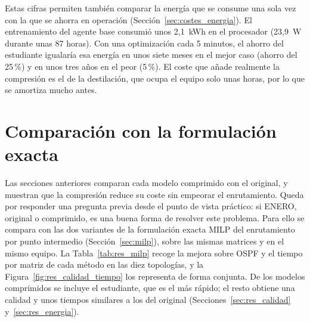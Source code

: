 Estas cifras permiten también comparar la energía que se consume una sola vez con la que se ahorra en operación (Sección~\ref{sec:costes_energia}). El entrenamiento del agente base consumió unos 2,1~kWh en el procesador (23,9~W durante unas 87 horas). Con una optimización cada 5 minutos, el ahorro del estudiante igualaría esa energía en unos siete meses en el mejor caso (ahorro del 25\,\%) y en unos tres años en el peor (5\,\%). El coste que añade realmente la compresión es el de la destilación, que ocupa el equipo solo unas horas, por lo que se amortiza mucho antes.

\section{Comparación con la formulación exacta}\label{sec:res_milp}

Las secciones anteriores comparan cada modelo comprimido con el original, y muestran que la compresión reduce su coste sin empeorar el enrutamiento. Queda por responder una pregunta previa desde el punto de vista práctico: si ENERO, original o comprimido, es una buena forma de resolver este problema. Para ello se compara con las dos variantes de la formulación exacta MILP del enrutamiento por punto intermedio (Sección~\ref{sec:milp}), sobre las mismas matrices y en el mismo equipo. La Tabla~\ref{tab:res_milp} recoge la mejora sobre OSPF y el tiempo por matriz de cada método en las diez topologías, y la Figura~\ref{fig:res_calidad_tiempo} los representa de forma conjunta. De los modelos comprimidos se incluye el estudiante, que es el más rápido; el resto obtiene una calidad y unos tiempos similares a los del original (Secciones~\ref{sec:res_calidad} y~\ref{sec:res_energia}).


